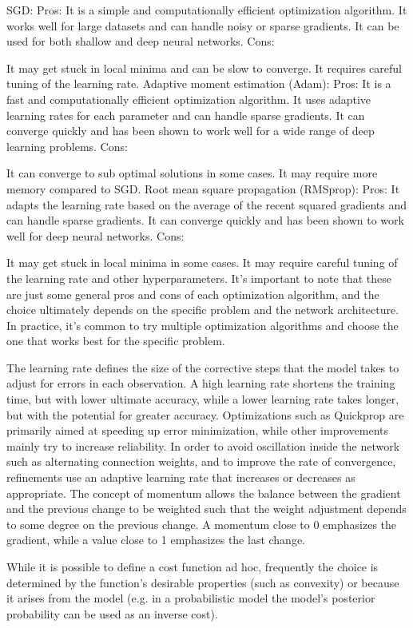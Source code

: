 \ac{SGD}:
Pros:
It is a simple and computationally efficient optimization algorithm.
It works well for large datasets and can handle noisy or sparse gradients.
It can be used for both shallow and deep neural networks.
Cons:

It may get stuck in local minima and can be slow to converge.
It requires careful tuning of the learning rate.
Adaptive moment estimation (Adam):
Pros:
It is a fast and computationally efficient optimization algorithm.
It uses adaptive learning rates for each parameter and can handle sparse gradients.
It can converge quickly and has been shown to work well for a wide range of deep learning problems.
Cons:

It can converge to sub optimal solutions in some cases.
It may require more memory compared to \ac{SGD}.
Root mean square propagation (RMSprop):
Pros:
It adapts the learning rate based on the average of the recent squared gradients and can handle sparse gradients.
It can converge quickly and has been shown to work well for deep neural networks.
Cons:

It may get stuck in local minima in some cases.
It may require careful tuning of the learning rate and other hyperparameters.
It's important to note that these are just some general pros and cons of each optimization algorithm, and the choice ultimately depends on the specific problem and the network architecture. In practice, it's common to try multiple optimization algorithms and choose the one that works best for the specific problem.

The learning rate defines the size of the corrective steps that the model takes to adjust for errors in each observation. A high learning rate shortens the training time, but with lower ultimate accuracy, while a lower learning rate takes longer, but with the potential for greater accuracy. Optimizations such as Quickprop are primarily aimed at speeding up error minimization, while other improvements mainly try to increase reliability. In order to avoid oscillation inside the network such as alternating connection weights, and to improve the rate of convergence, refinements use an adaptive learning rate that increases or decreases as appropriate. The concept of momentum allows the balance between the gradient and the previous change to be weighted such that the weight adjustment depends to some degree on the previous change. A momentum close to 0 emphasizes the gradient, while a value close to 1 emphasizes the last change.

While it is possible to define a cost function ad hoc, frequently the choice is determined by the function's desirable properties (such as convexity) or because it arises from the model (e.g. in a probabilistic model the model's posterior probability can be used as an inverse cost).

